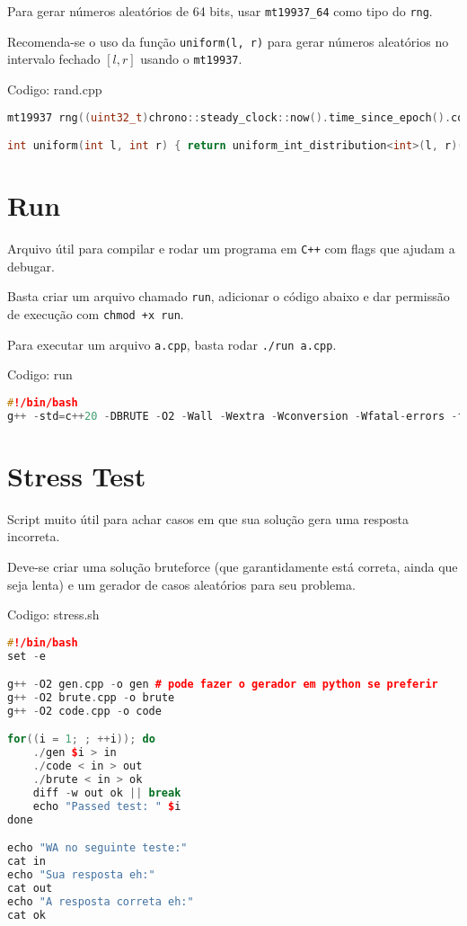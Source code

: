 \documentclass[10pt, a4paper, oneside]{book}
\begin{document}
Para gerar números aleatórios de 64 bits, usar \texttt{mt19937\_64} como tipo do \texttt{rng}.

Recomenda-se o uso da função \texttt{uniform(l, r)} para gerar números aleatórios no intervalo fechado $[l, r]$ usando o \texttt{mt19937}.

\hfill

Codigo: rand.cpp

\begin{lstlisting}[language=C++]
mt19937 rng((uint32_t)chrono::steady_clock::now().time_since_epoch().count());

int uniform(int l, int r) { return uniform_int_distribution<int>(l, r)(rng); }
\end{lstlisting}
\hfill

\section{Run}


Arquivo útil para compilar e rodar um programa em \texttt{C++} com flags que ajudam a debugar.

Basta criar um arquivo chamado \texttt{run}, adicionar o código abaixo e dar permissão de execução com \texttt{chmod +x run}.

Para executar um arquivo \texttt{a.cpp}, basta rodar \texttt{./run a.cpp}.

\hfill

Codigo: run

\begin{lstlisting}[language=C++]
#!/bin/bash
g++ -std=c++20 -DBRUTE -O2 -Wall -Wextra -Wconversion -Wfatal-errors -fsanitize=address,undefined $1 && ./a.out\end{lstlisting}
\hfill

\section{Stress Test}


Script muito útil para achar casos em que sua solução gera uma resposta incorreta.

Deve-se criar uma solução bruteforce (que garantidamente está correta, ainda que seja lenta) e um gerador de casos aleatórios para seu problema.
\hfill

Codigo: stress.sh

\begin{lstlisting}[language=C++]
#!/bin/bash
set -e

g++ -O2 gen.cpp -o gen # pode fazer o gerador em python se preferir
g++ -O2 brute.cpp -o brute
g++ -O2 code.cpp -o code

for((i = 1; ; ++i)); do
    ./gen $i > in
    ./code < in > out
    ./brute < in > ok
    diff -w out ok || break
    echo "Passed test: " $i
done

echo "WA no seguinte teste:"
cat in
echo "Sua resposta eh:"
cat out
echo "A resposta correta eh:"
cat ok\end{lstlisting}
\hfill
\end{document}
